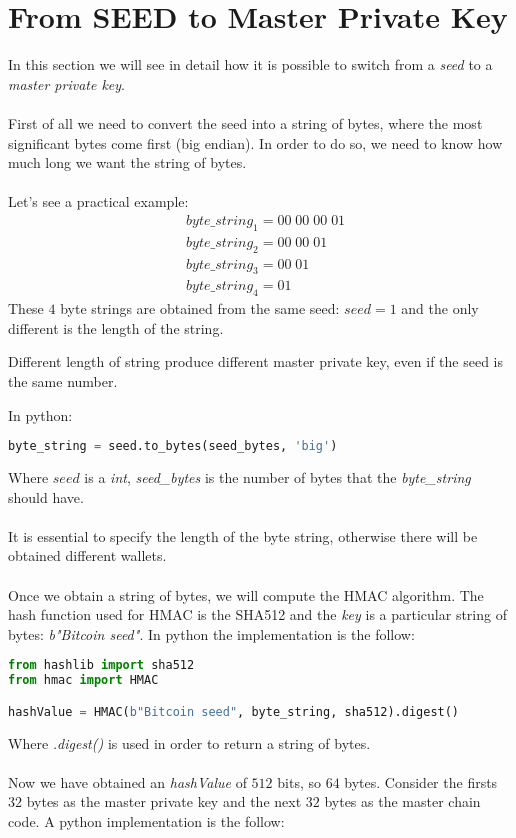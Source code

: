 \section{From SEED to Master Private Key}
In this section we will see in detail how it is possible to switch from a \textit{seed} to a \textit{master private key}. \\ \\
First of all we need to convert the seed into a string of bytes, where the most significant bytes come first (big endian). In order to do so, we need to know how much long we want the string of bytes. \\ \\
Let's see a practical example:
\begin{equation*}
\begin{split}
&byte\_string_1=00\; 00\; 00 \; 01 \\
&byte\_string_2=00\; 00\; 01 \\
&byte\_string_3=00\; 01 \\
&byte\_string_4=01
\end{split}
\end{equation*}
These $4$ byte strings are obtained from the same seed: $seed=1$ and the only different is the length of the string.
\begin{remark}
	Different length of string produce different master private key, even if the seed is the same number.
\end{remark}
In python:
\begin{lstlisting}[language=Python]
byte_string = seed.to_bytes(seed_bytes, 'big')
\end{lstlisting}
Where $seed$ is a \textit{int}, \textit{seed\_bytes} is the number of bytes that the \textit{byte\_string} should have. \\ \\
It is essential to specify the length of the byte string, otherwise there will be obtained different wallets. \\ \\
Once we obtain a string of bytes, we will compute the HMAC algorithm. The hash function used for HMAC is the SHA512 and the \textit{key} is a particular string of bytes: \textit{b"Bitcoin seed"}. In python the implementation is the follow:

\begin{lstlisting}[language=Python]
from hashlib import sha512
from hmac import HMAC

hashValue = HMAC(b"Bitcoin seed", byte_string, sha512).digest()
\end{lstlisting}
Where \textit{.digest()} is used in order to return a string of bytes.
\\ \\
Now we have obtained an \textit{hashValue} of $512$ bits, so $64$ bytes. Consider the firsts $32$ bytes as the master private key and the next $32$ bytes as the master chain code. A python implementation is the follow:

